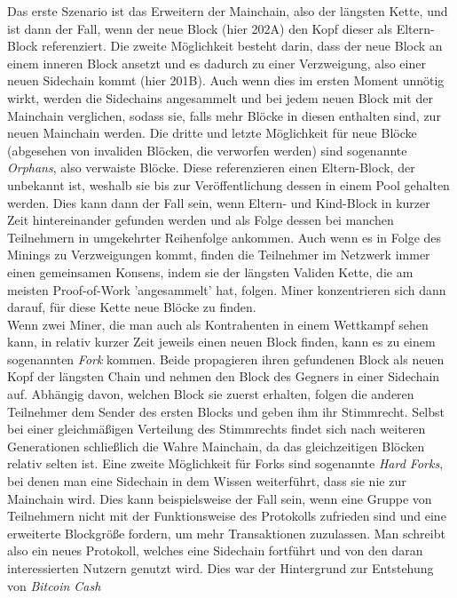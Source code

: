 Das erste Szenario ist das Erweitern der Mainchain, also der längsten Kette, und ist dann der Fall, wenn der neue Block (hier 202A) den Kopf dieser als Eltern-Block referenziert.
Die zweite Möglichkeit besteht darin, dass der neue Block an einem inneren Block ansetzt und es dadurch zu einer Verzweigung, also einer neuen Sidechain kommt (hier 201B). Auch wenn dies im ersten Moment unnötig wirkt, werden die Sidechains angesammelt und bei jedem neuen Block mit der Mainchain verglichen, sodass sie, falls mehr Blöcke in diesen enthalten sind, zur neuen Mainchain werden.
Die dritte und letzte Möglichkeit für neue Blöcke (abgesehen von invaliden Blöcken, die verworfen werden) sind sogenannte \emph{Orphans}, also verwaiste Blöcke. Diese referenzieren einen Eltern-Block, der unbekannt ist, weshalb sie bis zur Veröffentlichung dessen in einem Pool gehalten werden. Dies kann dann der Fall sein, wenn Eltern- und Kind-Block in kurzer Zeit hintereinander gefunden werden und als Folge dessen bei manchen Teilnehmern in umgekehrter Reihenfolge ankommen. Auch wenn es in Folge des Minings zu Verzweigungen kommt, finden die Teilnehmer im Netzwerk immer einen gemeinsamen Konsens, indem sie der längsten Validen Kette, die am meisten Proof-of-Work 'angesammelt' hat, folgen. Miner konzentrieren sich dann darauf, für diese Kette neue Blöcke zu finden.\\
Wenn zwei Miner, die man auch als Kontrahenten in einem Wettkampf sehen kann, in relativ kurzer Zeit jeweils einen neuen Block finden, kann es zu einem sogenannten \emph{Fork} kommen. Beide propagieren ihren gefundenen Block als neuen Kopf der längsten Chain und nehmen den Block des Gegners in einer Sidechain auf. Abhängig davon, welchen Block sie zuerst erhalten, folgen die anderen Teilnehmer dem Sender des ersten Blocks und geben ihm ihr Stimmrecht. Selbst bei einer gleichmäßigen Verteilung des Stimmrechts findet sich nach weiteren Generationen schließlich die Wahre Mainchain, da das gleichzeitigen Blöcken relativ selten ist.
Eine zweite Möglichkeit für Forks sind sogenannte \emph{Hard Forks}, bei denen man eine Sidechain in dem Wissen weiterführt, dass sie nie zur Mainchain wird. Dies kann beispielsweise der Fall sein, wenn eine Gruppe von Teilnehmern nicht mit der Funktionsweise des Protokolls zufrieden sind und eine erweiterte Blockgröße fordern, um mehr Transaktionen zuzulassen. Man schreibt also ein neues Protokoll, welches eine Sidechain fortführt und von den daran interessierten Nutzern genutzt wird. Dies war der Hintergrund zur Entstehung von \emph{Bitcoin Cash} 
